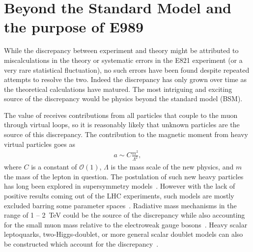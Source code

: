 \section{Beyond the Standard Model and the purpose of E989}
\label{sec:BSM}


While the discrepancy between experiment and theory might be attributed to miscalculations in the theory or systematic errors in the E821 experiment (or a very rare statistical fluctuation), no such errors have been found despite repeated attempts to resolve the two. Indeed the discrepancy has only grown over time as the theoretical calculations have matured. The most intriguing and exciting source of the discrepancy would be physics beyond the standard model (BSM). 


The value of \amu receives contributions from all particles that couple to the muon through virtual loops, so it is reasonably likely that unknown particles are the source of this discrepancy. The contribution to the magnetic moment from heavy virtual particles goes as 
		\begin{align}
            a \sim C \frac{m^{2}}{\Lambda^{2}},
		\end{align}
where $C$ is a constant of $\mathcal{O}(1)$, $\Lambda$ is the mass scale of the new physics, and $m$ the mass of the lepton in question. The postulation of such new heavy particles has long been explored in supersymmetry models~\cite{Czarnecki_2001}. However with the lack of positive results coming out of the LHC experiments, such models are mostly excluded barring some parameter spaces~\cite{Hagiwara_2018}. Radiative mass mechanisms in the range of 1 -- \SI{2}{\TeV} could be the source of the discrepancy while also accounting for the small muon mass relative to the electroweak gauge bosons~\cite{Czarnecki_2001}. Heavy scalar leptoquarks, two-Higgs-doublet, or more general scalar doublet models can also be constructed which account for the discrepancy~\cite{Leskow_2017,crivellin2019bto,Abe_2019}.



